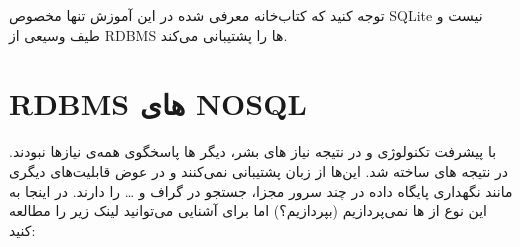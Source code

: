 \documentclass[]{article}
\begin{document}
توجه کنید که کتاب‌خانه معرفی شده در این آموزش تنها مخصوص SQLite نیست و طیف وسیعی از RDBMS ها را پشتیبانی می‌کند.




\section*{{\titr RDBMS های NOSQL}}

با پیشرفت تکنولوژی و در نتیجه نیاز های بشر، دیگر  ها پاسخگوی همه‌ی نیازها نبودند. در نتیجه  های  ساخته شد. این‌ها از زبان  پشتیبانی نمی‌کنند و در عوض قابلیت‌های دیگری مانند نگهداری پایگاه داده در چند سرور مجزا، جستجو در گراف و … را دارند. در اینجا به این نوع از  ها نمی‌پردازیم (بپردازیم؟) اما برای آشنایی می‌توانید لینک زیر را مطالعه کنید:

\begin{flushleft}
\href{https://www.mongodb.com/nosql-explained}{\textcolor{blue}{\underline{}}}

\end{flushleft}
\end{document}
